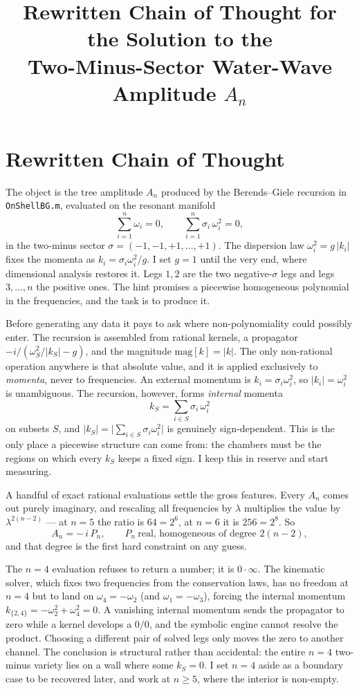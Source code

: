 \documentclass[11pt]{article}
\title{Rewritten Chain of Thought for the Solution to the\\ Two-Minus-Sector Water-Wave Amplitude $A_n$}
\author{}
\date{}
\begin{document}
\maketitle
\vspace{-3em}

\section*{Rewritten Chain of Thought}

The object is the tree amplitude $A_n$ produced by the Berends--Giele recursion in
\texttt{OnShellBG.m}, evaluated on the resonant manifold
\[
\sum_{i=1}^{n}\omega_i = 0,
\qquad
\sum_{i=1}^{n}\sigma_i\,\omega_i^2 = 0,
\]
in the two-minus sector $\sigma=(-1,-1,+1,\dots,+1)$. The dispersion law $\omega_i^2=g\,|k_i|$
fixes the momenta as $k_i=\sigma_i\omega_i^2/g$. I set $g=1$ until the very end, where
dimensional analysis restores it. Legs $1,2$ are the two negative-$\sigma$ legs and legs
$3,\dots,n$ the positive ones. The hint promises a piecewise homogeneous polynomial in the
frequencies, and the task is to produce it.

Before generating any data it pays to ask where non-polynomiality could possibly enter. The
recursion is assembled from rational kernels, a propagator $-i/(\omega_S^2/|k_S|-g)$, and the
magnitude $\mathrm{mag}[k]=|k|$. The only non-rational operation anywhere is that absolute
value, and it is applied exclusively to \emph{momenta}, never to frequencies. An external
momentum is $k_i=\sigma_i\omega_i^2$, so $|k_i|=\omega_i^2$ is unambiguous. The recursion,
however, forms \emph{internal} momenta
\[
k_S=\sum_{i\in S}\sigma_i\,\omega_i^2
\]
on subsets $S$, and $|k_S|=\big|\sum_{i\in S}\sigma_i\omega_i^2\big|$ is genuinely
sign-dependent. This is the only place a piecewise structure can come from: the chambers must
be the regions on which every $k_S$ keeps a fixed sign. I keep this in reserve and start
measuring.

A handful of exact rational evaluations settle the gross features. Every $A_n$ comes out purely
imaginary, and rescaling all frequencies by $\lambda$ multiplies the value by
$\lambda^{2(n-2)}$ --- at $n=5$ the ratio is $64=2^{6}$, at $n=6$ it is $256=2^{8}$. So
\[
A_n=-\,i\,P_n,\qquad P_n\ \text{real, homogeneous of degree } 2(n-2),
\]
and that degree is the first hard constraint on any guess.

The $n=4$ evaluation refuses to return a number; it is $0\cdot\infty$. The kinematic solver,
which fixes two frequencies from the conservation laws, has no freedom at $n=4$ but to land on
$\omega_4=-\omega_2$ (and $\omega_1=-\omega_3$), forcing the internal momentum
$k_{\{2,4\}}=-\omega_2^2+\omega_4^2=0$. A vanishing internal momentum sends the propagator to
zero while a kernel develops a $0/0$, and the symbolic engine cannot resolve the product.
Choosing a different pair of solved legs only moves the zero to another channel. The conclusion
is structural rather than accidental: the entire $n=4$ two-minus variety lies on a wall where
some $k_S=0$. I set $n=4$ aside as a boundary case to be recovered later, and work at
$n\ge 5$, where the interior is non-empty.
\end{document}

